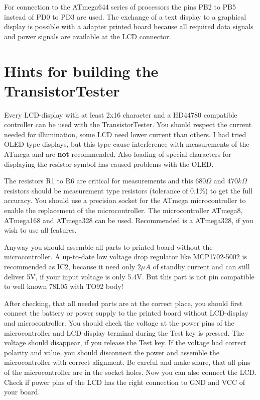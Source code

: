 For connection to the ATmega644 series of processors the pins PB2 to PB5 instead of PD0 to PD3 are used.
The exchange of a text display to a graphical display is possible with a adapter printed board because
all required data signals and power signals are available at the LCD connector.


\section{Hints for building the TransistorTester}
Every LCD-display with at least 2x16 character and a HD44780 compatible controller
can be used with the TransistorTester. You should respect the current needed for
illumination, some LCD need lower current than others.
I had tried OLED type displays, but this type cause interference with measurements
of the ATmega and are {\bf not} recommended. Also loading of special characters
for displaying the resistor symbol has caused problems with the OLED.

The resistors R1 to R6 are critical for measurements and this \(680\Omega\) and
\(470k\Omega\) resistors should be measurement type resistors (tolerance of 0.1\%) to
get the full accuracy.
You should use a precision socket for the ATmega microcontroller to enable
the replacement of the microcontroller.
The microcontroller ATmega8, ATmega168 and ATmega328 can be used.
Recommended is a ATmega328, if you wish to use all features.

Anyway you should assemble all parts to printed board without the microcontroller.
A up-to-date low voltage drop regulator like MCP1702-5002 is recommended as IC2, because it
need only \(2\mu A\) of standby current and can still deliver 5V, if your input
voltage is only 5.4V. But this part is not pin compatible to well known 78L05 with TO92 body!

After checking, that all needed parts are at the correct place, you should
first connect the battery or power supply to the printed board without LCD-display
and microcontroller. You should check the voltage at the power pins of the
microcontroller and LCD-display terminal during the Test key is pressed.
The voltage should disappear, if you release the Test key.
If the voltage had correct polarity and value,
you should disconnect the power and assemble the microcontroller with correct
alignment. Be careful and make shure, that all pins of the microcontroller
are in the socket holes.
Now you can also connect the LCD. Check if power pins of the LCD has the right connection to
GND and VCC of your board.

